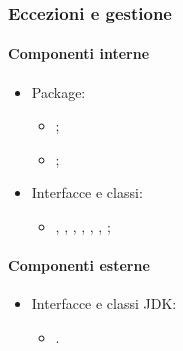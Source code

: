 \documentclass[../Funzionalita.tex]{subfiles}
\begin{document}
			
		\subsubsection{Eccezioni e gestione}
		\paragraph*{Componenti interne}
			\begin{itemize}
			
				\item Package:
				\begin{itemize}
					\item[] \model;
					\item[] \navigator;
				\end{itemize}
				
				\item Interfacce e classi:
				\begin{itemize}
					\item[] \NavigationManagerImp, \Navigator, \NavigatorImp, \NavigationExceptions, \NoGraphSetException, \PathException, \NoNavigationInformationException;
				\end{itemize}
				
			\end{itemize}
			
			
			\paragraph*{Componenti esterne}
			\begin{itemize}
			
				\item Interfacce e classi JDK:
				\begin{itemize}
					\item[] \Exception.
				\end{itemize}
				
			\end{itemize}
			
\end{document}

